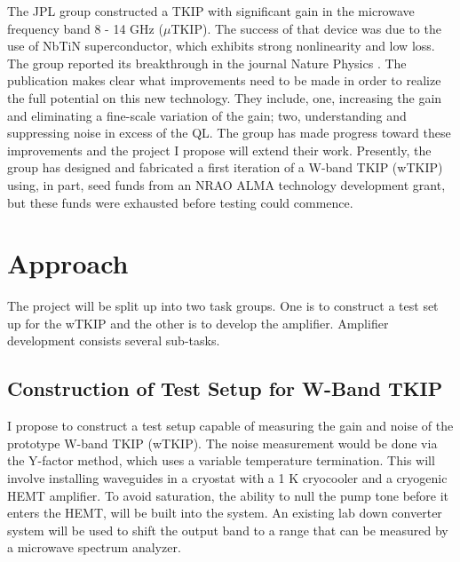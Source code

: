 The JPL group constructed a TKIP with significant gain in the microwave frequency band 8 - 14 GHz ($\mu$TKIP). The success of that device was due to the use of  NbTiN superconductor, which exhibits strong nonlinearity and low loss. The group reported its breakthrough in the journal Nature Physics \cite{Eom2012}. The publication makes clear what improvements need to be made in order to realize the full potential on this new technology. They include, one, increasing the  gain and eliminating a fine-scale variation of the gain; two, understanding and suppressing noise in excess of the QL. The group has made progress toward these improvements and the project I propose will extend their work.  Presently, the group has designed and fabricated a first iteration of a W-band TKIP (wTKIP) using, in part, seed funds from an NRAO ALMA technology development grant, but these funds were exhausted before testing could commence. 


%
%
%


\section{Approach}
The project will be split up into two task groups. One is to construct a test set up for the wTKIP and the other is to develop the amplifier. Amplifier development consists several sub-tasks.  

\subsection{Construction of Test Setup for W-Band TKIP}
I propose to construct a test setup capable of measuring the gain and noise of the prototype W-band TKIP (wTKIP). The noise measurement would be done via the Y-factor method, which uses a variable temperature termination. This will involve installing waveguides in a cryostat with a 1 K cryocooler and a cryogenic HEMT amplifier. To avoid saturation, the ability to null the pump tone before it enters the HEMT, will be built into the system. An existing lab down converter system will be used to shift the output band to a range that can be measured by a microwave spectrum analyzer.


